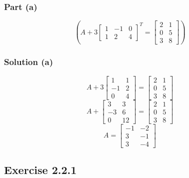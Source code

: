 \documentclass[12pt]{article}
\begin{document}
\subsubsection*{Part (a)}
\[
  \begin{equation*}
    \left(A + 3\begin{bmatrix}
        1 & -1 & 0\\ 
        1 & 2 & 4 
    \end{bmatrix}^T
    = \begin{bmatrix}
      2 & 1\\ 
      0 & 5\\ 
      3 & 8 
    \end{bmatrix}
    \right)
  \end{equation*}
\]
\subsubsection*{Solution (a)}
\begin{equation*}
  A + 3\begin{bmatrix}
    1 & 1\\ 
    -1 & 2\\ 
    0 & 4 
  \end{bmatrix}
  = \begin{bmatrix}
    2 & 1\\ 
    0 & 5\\ 
    3 & 8 
  \end{bmatrix}
\end{equation*}
\begin{equation*}
  A + \begin{bmatrix}
    3 & 3\\ 
    -3 & 6\\ 
    0 & 12 
  \end{bmatrix}
  = \begin{bmatrix}
    2 & 1\\ 
    0 & 5\\ 
    3 & 8 
  \end{bmatrix}
\end{equation*}
\begin{equation*}
  A = \begin{bmatrix}
    -1 & -2\\ 
    3 & -1\\ 
    3 & -4
  \end{bmatrix}
\end{equation*}
\subsection*{Exercise 2.2.1}
\end{document}

